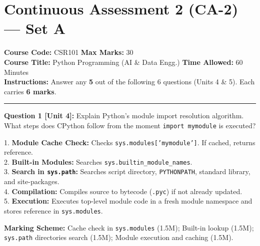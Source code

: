 \section{Continuous Assessment 2 (CA-2) --- Set A}
\noindent\textbf{Course Code:} CSR101 \hfill \textbf{Max Marks:} 30\\
\textbf{Course Title:} Python Programming (AI \& Data Engg.) \hfill \textbf{Time Allowed:} 60 Minutes\\
\textbf{Instructions:} Answer any \textbf{5} out of the following 6 questions (Units 4 \& 5). Each carries \textbf{6 marks}.
\vspace{4mm}
\hrule
\vspace{4mm}

\noindent\textbf{Question 1 [Unit 4]:} Explain Python's module import resolution algorithm. What steps does CPython follow from the moment \texttt{import mymodule} is executed?
\begin{solutionbox}
1. \textbf{Module Cache Check:} Checks \texttt{sys.modules['mymodule']}. If cached, returns reference.\\
2. \textbf{Built-in Modules:} Searches \texttt{sys.builtin\_module\_names}.\\
3. \textbf{Search in \texttt{sys.path}:} Searches script directory, \texttt{PYTHONPATH}, standard library, and site-packages.\\
4. \textbf{Compilation:} Compiles source to bytecode (\texttt{.pyc}) if not already updated.\\
5. \textbf{Execution:} Executes top-level module code in a fresh module namespace and stores reference in \texttt{sys.modules}.
\end{solutionbox}
\begin{markingrubric}
\textbf{Marking Scheme:} Cache check in \texttt{sys.modules} (1.5M); Built-in lookup (1.5M); \texttt{sys.path} directories search (1.5M); Module execution and caching (1.5M).
\end{markingrubric}


